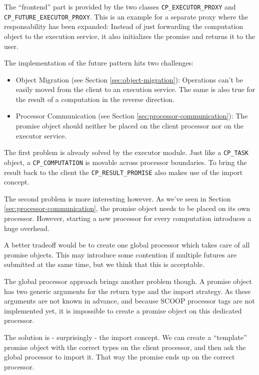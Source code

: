 The ``frontend'' part is provided by the two classes \lstinline!CP_EXECUTOR_PROXY! and \lstinline!CP_FUTURE_EXECUTOR_PROXY!.
This is an example for a separate proxy where the responsability has been expanded:
Instead of just forwarding the computation object to the execution service, it also initializes the promise and returns it to the user.

The implementation of the future pattern hits two challenges:
\begin{itemize}
 \item Object Migration (see Section \ref{sec:object-migration}):
 Operations can't be easily moved from the client to an execution service.
 The same is also true for the result of a computation in the reverse direction.
 \item Processor Communication (see Section \ref{sec:processor-communication}):
 The promise object should neither be placed on the client processor nor on the executor service.
\end{itemize}

The first problem is already solved by the executor module. 
Just like a \lstinline!CP_TASK! object, a \lstinline!CP_COMPUTATION! is movable across processor boundaries.
To bring the result back to the client the \lstinline!CP_RESULT_PROMISE! also makes use of the import concept.

The second problem is more interesting however.
As we've seen in Section \ref{sec:processor-communication}, the promise object needs to be placed on its own processor.
However, starting a new processor for every computation introduces a huge overhead.

A better tradeoff would be to create one global processor which takes care of all promise objects.
This may introduce some contention if multiple futures are submitted at the same time, but we think that this is acceptable.

The global processor approach brings another problem though.
A promise object has two generic arguments for the return type and the import strategy.
As these arguments are not known in advance, and because SCOOP processor tags \cite[p. 90]{Nienaltowski07} are not implemented yet, it is impossible to create a promise object on this dedicated processor.

The solution is - surprisingly - the import concept.
We can create a ``template'' promise object with the correct types on the client processor, and then ask the global processor to import it.
That way the promise ends up on the correct processor.
